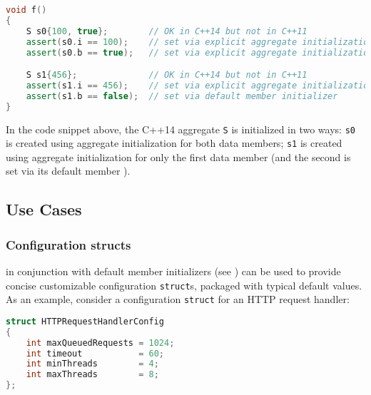 \begin{lstlisting}[language=C++]
void f()
{
    S s0{100, true};        // OK in C++14 but not in C++11
    assert(s0.i == 100);    // set via explicit aggregate initialization (above)
    assert(s0.b == true);   // set via explicit aggregate initialization (above)

    S s1{456};              // OK in C++14 but not in C++11
    assert(s1.i == 456);    // set via explicit aggregate initialization (above)
    assert(s1.b == false);  // set via default member initializer
}
\end{lstlisting}

\noindent In the code snippet above, the C++14 aggregate \lstinline!S! is initialized
in two ways: \lstinline!s0! is created using aggregate initialization for
both data members; \lstinline!s1! is created using aggregate
initialization for only the first data member (and the second is set via its
default member ).

\subsection[Use Cases]{Use Cases}\label{use-cases}

\subsubsection[Configuration \lstinline!struct!s]{Configuration {\SubsubsecCode struct}s}\label{configuration-structs}

 in conjunction with default member initializers (see ) can be used to provide concise customizable
configuration \lstinline!struct!s, packaged with typical default values. As
an example, consider a configuration \lstinline!struct! for an HTTP request
handler:

\begin{lstlisting}[language=C++]
struct HTTPRequestHandlerConfig
{
    int maxQueuedRequests = 1024;
    int timeout           = 60;
    int minThreads        = 4;
    int maxThreads        = 8;
};
\end{lstlisting}

